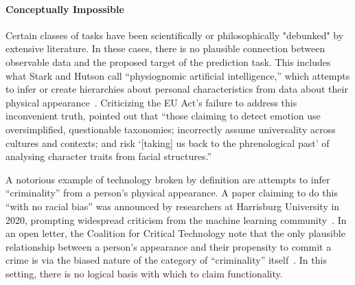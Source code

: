 \documentclass[acmconf,manuscript,screen,natbib=true]{acmart}
\begin{document}
\paragraph{Conceptually Impossible}


Certain classes of tasks have been scientifically or philosophically "debunked" by extensive literature. In these cases, there is no plausible connection between observable data and the proposed target of the prediction task. This includes what Stark and Hutson call “physiognomic artificial intelligence,” which attempts to infer or create hierarchies about personal characteristics from data about their physical appearance~\cite{stark_and_hutson}. %
Criticizing the EU Act's failure to address this inconvenient truth, \citet{veale_euact} pointed out that 
``those claiming to detect emotion use oversimplified, questionable taxonomies; incorrectly assume universality across cultures and contexts; and risk `[taking] us back to the phrenological past' of analysing character traits from facial structures.''



A notorious example of technology broken by definition are attempts to infer “criminality” from a person’s physical appearance. A paper claiming to do this “with no racial bias” was announced by researchers at Harrisburg University in 2020, prompting widespread criticism from the machine learning community~\cite{wired_criminality}. In an open letter, the Coalition for Critical Technology %
note that the only plausible relationship between a person’s appearance and their propensity to commit a crime is via the biased nature of the category of “criminality” itself~\cite{coalition}. In this setting, %
there is no logical basis with which to claim functionality.
\end{document}
